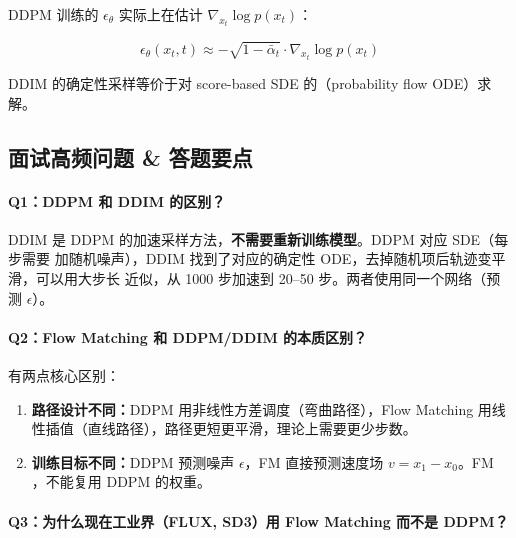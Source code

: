 DDPM 训练的 $\epsilon_\theta$ 实际上在估计
$\nabla_{x_t} \log p(x_t)$：

$$\epsilon_\theta(x_t, t) \approx -\sqrt{1-\bar{\alpha}_t}
  \cdot \nabla_{x_t} \log p(x_t)$$

DDIM 的确定性采样等价于对 score-based SDE 的（probability flow
ODE）求解。

\subsection{面试高频问题 \& 答题要点}

\paragraph{Q1：DDPM 和 DDIM 的区别？}

\begin{conceptbox}
DDIM 是 DDPM 的加速采样方法，\textbf{不需要重新训练模型}。DDPM 对应 SDE（每步需要
加随机噪声），DDIM 找到了对应的确定性 ODE，去掉随机项后轨迹变平滑，可以用大步长
近似，从 1000 步加速到 20--50 步。两者使用同一个网络（预测 $\epsilon$）。
\end{conceptbox}

\paragraph{Q2：Flow Matching 和 DDPM/DDIM 的本质区别？}

\begin{conceptbox}
有两点核心区别：
\begin{enumerate}
  \item \textbf{路径设计不同：}DDPM 用非线性方差调度（弯曲路径），Flow Matching
        用线性插值（直线路径），路径更短更平滑，理论上需要更少步数。
  \item \textbf{训练目标不同：}DDPM 预测噪声 $\epsilon$，FM 直接预测速度场
        $v = x_1 - x_0$。FM ，不能复用 DDPM 的权重。
\end{enumerate}
\end{conceptbox}

\paragraph{Q3：为什么现在工业界（FLUX, SD3）用 Flow Matching 而不是 DDPM？}

